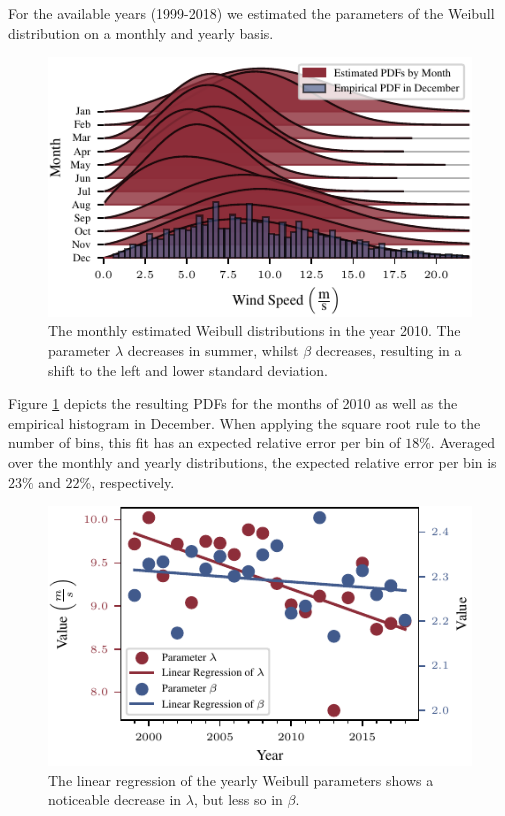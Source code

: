 \documentclass{article}
\theoremstyle{plain}
\theoremstyle{definition}
\theoremstyle{remark}
\begin{document}
For the available years (1999-2018) we estimated the parameters of the Weibull distribution on a monthly and yearly basis. 
\begin{figure}
    \centering 
    \includegraphics{fig/monthly_weibull.pdf}
    \caption{The monthly estimated Weibull distributions in the year 2010. The parameter $\lambda$ decreases in summer, whilst $\beta$ decreases, resulting in a shift to the left and lower standard deviation.}
    \label{fig:monthly_weibull}
\end{figure}
Figure \ref{fig:monthly_weibull} depicts the resulting PDFs for the months of 2010 as well 
as the empirical histogram in December.
When applying the square root rule to the number of bins,
 this fit has an expected relative error per bin of $18 \%$. 
 Averaged over the monthly and yearly distributions,
 the expected relative error per bin is  $23 \%$ and $22 \%$, respectively.

\begin{figure}
    \centering
    \includegraphics{fig/linreg_parameters.pdf}
    \caption{The linear regression of the yearly Weibull parameters shows a noticeable decrease in 
 \textcolor{TUred}{$\lambda$}, but less so in \textcolor{TUdarkblue}{$\beta$}.}
    \label{fig:lin_reg}
\end{figure}
\end{document}

